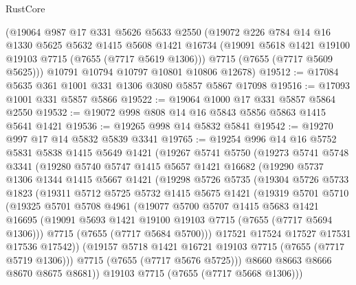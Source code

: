\begin{lexlean}{RustCore}
\begin{coremodule}
    (@19064
      @987
      @17
      @331
      @5626
      @5633
      @2550
      (@19072
        @226
        @784
        @14
        @16
        @1330
        @5625
        @5632
        @1415
        @5608
        @1421
        @16734
        (@19091 @5618 @1421 @19100 @19103 @7715 (@7655 (@7717 @5619 @1306)))
        @7715
        (@7655 (@7717 @5609 @5625)))
      @10791
      @10794
      @10797
      @10801
      @10806
      @12678)
@19512 := @17084 @5635 @361 @1001 @331 @1306 @3080 @5857 @5867 @17098
@19516 := @17093 @1001 @331 @5857 @5866
@19522 := @19064 @1000 @17 @331 @5857 @5864 @2550
@19532 := @19072 @998 @808 @14 @16 @5843 @5856 @5863 @1415 @5641 @1421
@19536 := @19265 @998 @14 @5832 @5841
@19542 := @19270 @997 @17 @14 @5832 @5839 @3341
@19765 := @19254
    @996
    @14
    @16
    @5752
    @5831
    @5838
    @1415
    @5649
    @1421
    (@19267
      @5741
      @5750
      (@19273
        @5741
        @5748
        @3341
        (@19280
          @5740
          @5747
          @1415
          @5657
          @1421
          @16682
          (@19290
            @5737
            @1306
            @1344
            @1415
            @5667
            @1421
            (@19298
              @5726
              @5735
              (@19304
                @5726
                @5733
                @1823
                (@19311
                  @5712
                  @5725
                  @5732
                  @1415
                  @5675
                  @1421
                  (@19319
                    @5701
                    @5710
                    (@19325
                      @5701
                      @5708
                      @4961
                      (@19077
                        @5700
                        @5707
                        @1415
                        @5683
                        @1421
                        @16695
                        (@19091 @5693 @1421 @19100 @19103 @7715 (@7655 (@7717 @5694 @1306)))
                        @7715
                        (@7655 (@7717 @5684 @5700)))
                      @17521
                      @17524
                      @17527
                      @17531
                      @17536
                      @17542))
                  (@19157 @5718 @1421 @16721 @19103 @7715 (@7655 (@7717 @5719 @1306)))
                  @7715
                  (@7655 (@7717 @5676 @5725)))
                @8660
                @8663
                @8666
                @8670
                @8675
                @8681))
            @19103
            @7715
            (@7655 (@7717 @5668 @1306)))

\end{coremodule}
\end{lexlean}
